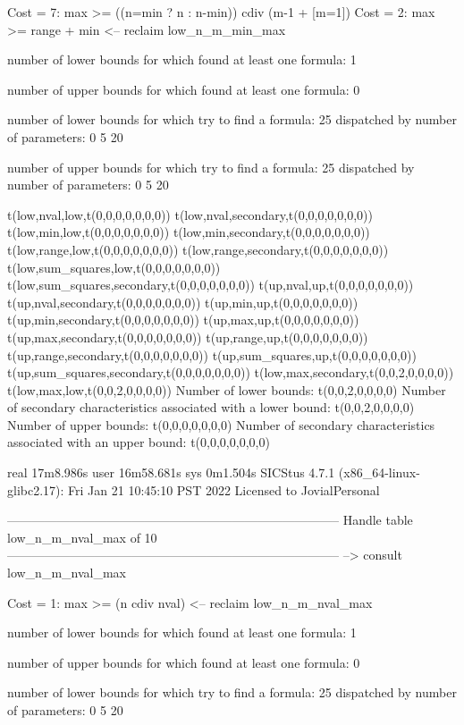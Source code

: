Cost =  7:  max >= ((n=min ? n : n-min)) cdiv (m-1 + [m=1]) %
Cost =  2:  max >= range + min
<-- reclaim low_n_m_min_max

number of lower bounds for which found at least one formula: 1

number of upper bounds for which found at least one formula: 0

number of lower bounds for which try to find a formula: 25
dispatched by number of parameters: 0  5  20

number of upper bounds for which try to find a formula: 25
dispatched by number of parameters: 0  5  20

t(low,nval,low,t(0,0,0,0,0,0,0))
t(low,nval,secondary,t(0,0,0,0,0,0,0))
t(low,min,low,t(0,0,0,0,0,0,0))
t(low,min,secondary,t(0,0,0,0,0,0,0))
t(low,range,low,t(0,0,0,0,0,0,0))
t(low,range,secondary,t(0,0,0,0,0,0,0))
t(low,sum_squares,low,t(0,0,0,0,0,0,0))
t(low,sum_squares,secondary,t(0,0,0,0,0,0,0))
t(up,nval,up,t(0,0,0,0,0,0,0))
t(up,nval,secondary,t(0,0,0,0,0,0,0))
t(up,min,up,t(0,0,0,0,0,0,0))
t(up,min,secondary,t(0,0,0,0,0,0,0))
t(up,max,up,t(0,0,0,0,0,0,0))
t(up,max,secondary,t(0,0,0,0,0,0,0))
t(up,range,up,t(0,0,0,0,0,0,0))
t(up,range,secondary,t(0,0,0,0,0,0,0))
t(up,sum_squares,up,t(0,0,0,0,0,0,0))
t(up,sum_squares,secondary,t(0,0,0,0,0,0,0))
t(low,max,secondary,t(0,0,2,0,0,0,0))
t(low,max,low,t(0,0,2,0,0,0,0))
Number of lower bounds:                                             t(0,0,2,0,0,0,0)
Number of secondary characteristics associated with a lower bound:  t(0,0,2,0,0,0,0)
Number of upper bounds:                                             t(0,0,0,0,0,0,0)
Number of secondary characteristics associated with an upper bound: t(0,0,0,0,0,0,0)

real	17m8.986s
user	16m58.681s
sys	0m1.504s
SICStus 4.7.1 (x86_64-linux-glibc2.17): Fri Jan 21 10:45:10 PST 2022
Licensed to JovialPersonal


--------------------------------------------------------------------------------
Handle table low_n_m_nval_max of 10
--------------------------------------------------------------------------------
--> consult low_n_m_nval_max

Cost =  1:  max >= (n cdiv nval)
<-- reclaim low_n_m_nval_max

number of lower bounds for which found at least one formula: 1

number of upper bounds for which found at least one formula: 0

number of lower bounds for which try to find a formula: 25
dispatched by number of parameters: 0  5  20

